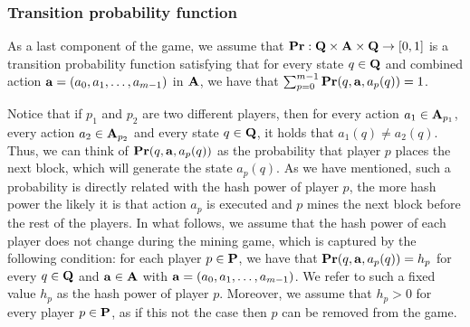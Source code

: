\subsubsection{Transition probability function}\label{sub:transi}

As a last component of the game, we assume that $\mathbf{Pr} : \mathbf{Q} \times \mathbf{A} \times \mathbf{Q} \to [0,1]$ is a transition probability function satisfying that for every state $q \in \mathbf{Q}$ and combined action $\mathbf{a} = (a_0, a_1, \ldots, a_{m-1})$ in $\mathbf{A}$, we have that $\sum_{p=0}^{m-1} \mathbf{Pr}(q, \mathbf{a}, a_p(q)) = 1$.

Notice that if $p_1$ and $p_2$ are two different players, then for every action $a_1 \in \mathbf{A}_{p_1}$, every action $a_2 \in \mathbf{A}_{p_2}$ and every state $q \in \mathbf{Q}$, it holds that $a_1(q) \neq a_2(q)$. Thus, we can think of $\mathbf{Pr}(q, \mathbf{a}, a_p(q))$ as the probability that player $p$ places the next block, which will generate the state $a_p(q)$. As we have mentioned, such a probability is directly related with the hash power of player $p$, the more hash power the likely it is that action $a_p$ is executed and $p$ mines the next block before the rest of the players. In what follows, we assume that the hash power of each player does not change during the mining game, which is captured by the following condition:
for each player $p \in \mathbf{P}$, we 
have that $\mathbf{Pr}(q, \mathbf{a}, a_p(q)) = h_p$ for every $q \in \mathbf{Q}$ and $\mathbf{a} \in \mathbf{A}$ with $\mathbf{a} = (a_0, a_1, \ldots, a_{m-1})$. We refer to such a fixed value $h_p$ 
as the hash power of player $p$.
Moreover, we assume that $h_p > 0$ for every player $p \in \mathbf{P}$, as if this not the case then $p$ can be removed from the game.


